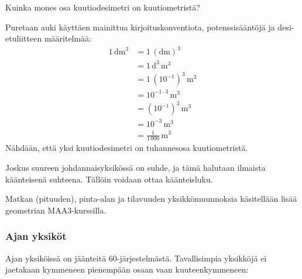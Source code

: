 \begin{esimerkki}
Kuinka mones osa kuutiodesimetri on kuutiometristä?
	\begin{esimratk}
	Puretaan auki käyttäen mainittua kirjoituskonventiota, potenssisääntöjä ja desi-etuliitteen määritelmää:
	\begin{align*}
	1\,\text{dm}^3&=1\,(\text{dm})^3\\
	&=1\,\text{d}^3\,\text{m}^3 \\
	&=1\,(10^{-1})^3\,\text{m}^3 \\
	&=10^{-1\cdot3}\,\text{m}^3 \\
	&=(10^{-1})^3\,\text{m}^3 \\
	&=10^{-3}\,\text{m}^3 \\
	&=\frac{1}{1\,000}\,\text{m}^3
	\end{align*}
	Nähdään, että yksi kuutiodesimetri on tuhannesosa kuutiometristä.
	\end{esimratk}
\end{esimerkki}





Joskus suureen johdannaisyksikössä on suhde, ja tämä halutaan ilmaista käänteisenä suhteena. Tällöin voidaan ottaa käänteisluku.


Matkan (pituuden), pinta-alan ja tilavuuden yksikkömuunnoksia käsitellään lisää geometrian MAA3-kurssilla. 

\subsubsection*{Ajan yksiköt}

Ajan yksiköissä on jäänteitä $60$-järjestelmästä. Tavallisimpia yksikköjä ei jaetakaan kymmeneen pienempään osaan vaan kuuteenkymmeneen:


